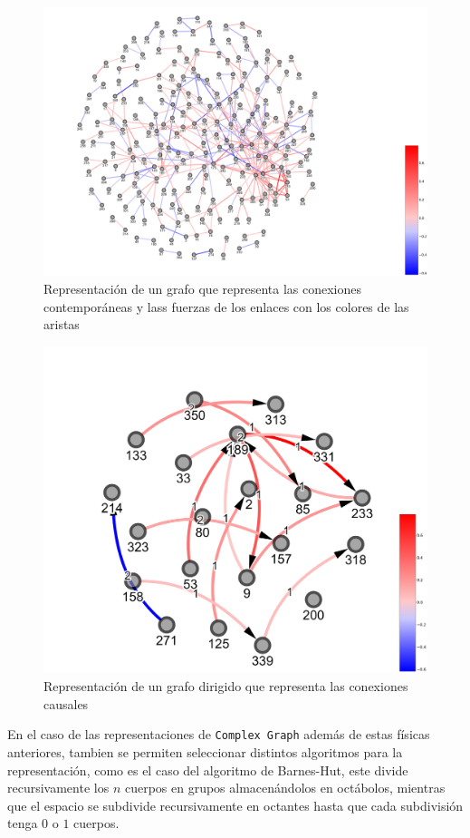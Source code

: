 \documentclass[a4paper,10pt,twocolumn]{article}
\begin{document}
\begin{figure}[h!]%
\includegraphics[scale=0.05]{graph_colorbar.jpg}
\caption{Representación de un grafo que representa las conexiones contemporáneas y lass fuerzas de los enlaces con los colores de las aristas}
\end{figure}


\begin{figure}[h!]%
\includegraphics[scale=0.1]{digraph_colorbar.jpg}
\caption{Representación de un grafo dirigido que representa las conexiones causales}
\end{figure}

En el caso de las representaciones de \texttt{Complex Graph} además de estas físicas anteriores, tambien se permiten seleccionar distintos algoritmos para la representación, como es el caso del algoritmo de Barnes-Hut, este divide recursivamente los $n$ cuerpos en grupos almacenándolos en octábolos, mientras que el espacio se subdivide recursivamente en octantes hasta que cada subdivisión tenga $0$ o $1$ cuerpos.\\
\end{document}
